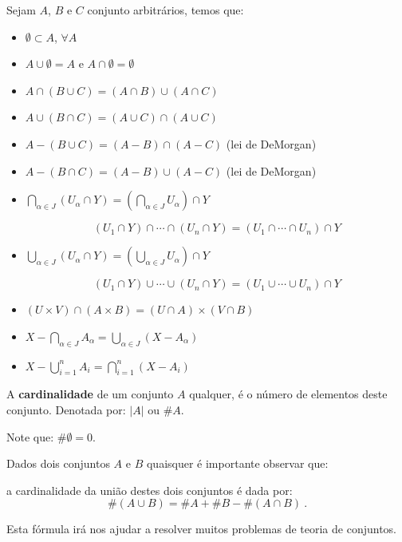 \begin{prop}
Sejam $A$, $B$ e $C$ conjunto arbitrários, temos que:
\begin{itemize}
 \item $\emptyset \subset A$, $\forall A$
 \item $A \cup \emptyset= A$ e $A \cap \emptyset= \emptyset$
 \item $A \cap (B \cup C) = (A \cap B) \cup (A \cap C)$
 \item $A \cup (B \cap C) = (A \cup C) \cap (A \cup C)$
 \item $A - (B \cup C) = (A - B) \cap (A - C)$ (lei de DeMorgan)
 \item $A - (B \cap C) = (A - B) \cup (A - C)$ (lei de DeMorgan)
 \item $\bigcap_{\alpha \in J}(U_{\alpha} \cap Y) = (\bigcap_{\alpha \in J} U_{\alpha}) \cap Y$
 
  $$(U_1 \cap Y) \cap \cdots \cap (U_n \cap Y) = (U_1 \cap \cdots \cap U_n) \cap Y$$
  
 \item $\bigcup_{\alpha \in J}(U_{\alpha} \cap Y) = (\bigcup_{\alpha \in J} U_{\alpha}) \cap Y$
 
 $$(U_1 \cap Y) \cup \cdots \cup (U_n \cap Y) = (U_1 \cup \cdots \cup U_n) \cap Y$$
 
 \item $(U \times V) \cap (A \times B) = (U \cap A) \times (V \cap B)$
 
 \item $X - \bigcap_{\alpha \in J} A_{\alpha} = \bigcup_{\alpha \in J}(X - A_{\alpha})$
 
 \item $X - \bigcup_{i= 1}^{n} A_i = \bigcap_{i = 1}^{n}(X - A_i)$
 
\end{itemize}
\end{prop}

 A \textbf{cardinalidade} de um conjunto $A$ qualquer, é o número de elementos deste conjunto. Denotada por: $|A|$ ou $\# A$. 
 
 Note que: $\# \emptyset= 0$.
 
 Dados dois conjuntos $A$ e $B$ quaisquer é importante observar que:
 \vskip0.3cm
 \colorbox{azul}{
 \begin{minipage}{14.5cm}
 \begin{center}
 a cardinalidade da união destes dois conjuntos é dada por:
  \[\#(A \cup B)= \# A + \# B - \#(A \cap B) \ .\]
 \end{center}
 \end{minipage}}
 \vskip0.3cm
 
 Esta fórmula irá nos ajudar a resolver muitos problemas de teoria de conjuntos.


 




